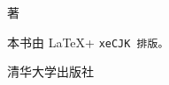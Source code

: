 \makeatletter

\begin{center}

\begin{Huge}
\xingkai{} \@title
\end{Huge}

\vskip 5cm

\@author 著

本书由 \LaTeX + \tt{xeCJK} 排版。

\end{center}

\null
\vfill



\begin{flushright}
清华大学出版社
\end{flushright}
\makeatother 
